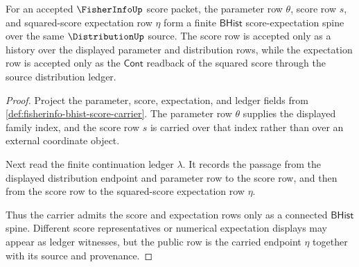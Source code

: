 \begin{theorem}
\label{thm:fisherinfo-score-row-carrier-obligation}
For an accepted $\FisherInfoUp$ score packet, the parameter row $\theta$, score
row $s$, and squared-score expectation row $\eta$ form a finite
$\mathsf{BHist}$ score-expectation spine over the same $\DistributionUp$
source. The score row is accepted only as a history over the displayed
parameter and distribution rows, while the expectation row is accepted only as
the $\mathsf{Cont}$ readback of the squared score through the source
distribution ledger.
\end{theorem}
\begin{proof}
Project the parameter, score, expectation, and ledger fields from
\autoref{def:fisherinfo-bhist-score-carrier}. The parameter row $\theta$
supplies the displayed family index, and the score row $s$ is carried over
that index rather than over an external coordinate object.

Next read the finite continuation ledger $\lambda$. It records the passage
from the displayed distribution endpoint and parameter row to the score row,
and then from the score row to the squared-score expectation row $\eta$.

Thus the carrier admits the score and expectation rows only as a connected
$\mathsf{BHist}$ spine. Different score representatives or numerical
expectation displays may appear as ledger witnesses, but the public row is the
carried endpoint $\eta$ together with its source and provenance.
\end{proof}

